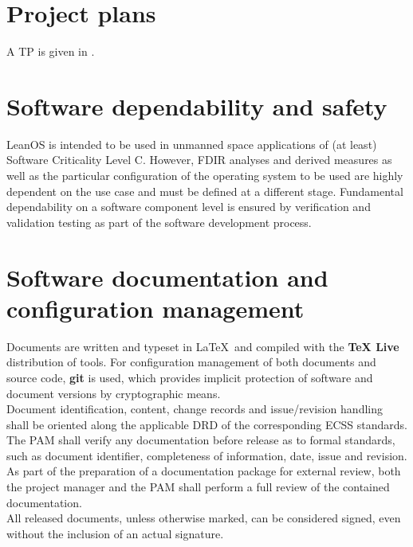 \section{Project plans}

A \glsdesc{TP} is given in \cite{leanosTP}.


\section{Software dependability and safety}

LeanOS is intended to be used in unmanned space
applications of (at least) Software Criticality Level C. However, \gls{FDIR}
analyses and derived measures as well as the particular configuration of
the operating system to be used are highly dependent on the use case and must
be defined at a different stage. Fundamental dependability on a software
component level is ensured by verification and validation testing as part of the
software development process.


\section{Software documentation and configuration management}

Documents are written and typeset in \LaTeX\ and compiled with the \textbf{TeX Live}
distribution of tools. For configuration management of both documents and source
code, \textbf{git} is used, which provides implicit protection of software and
document versions by cryptographic means.\\

\noindent
Document identification, content, change records and issue/revision handling
shall be oriented along the applicable \gls{DRD} of the corresponding ECSS
standards.\\

\noindent
The \gls{PAM} shall verify any documentation before release as to formal
standards, such as document identifier, completeness of information, date,
issue and revision.\\

\noindent
As part of the preparation of a documentation package for external review, both
the project manager and the \gls{PAM} shall perform a full review of the
contained documentation.\\

\noindent
All released documents, unless otherwise marked, can be considered signed, even
without the inclusion of an actual signature.\\

